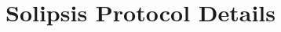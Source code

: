 \section{Solipsis Protocol Details}

\newcommand{\nd}{\ensuremath{\textsc{nd}}\xspace}
\newcommand{\UID}{\ensuremath{\textsc{UID}}\xspace}
\newcommand{\pos}{\ensuremath{\textsc{pos}}\xspace}
\newcommand{\sn}{\ensuremath{\textsc{sn}}\xspace}

\newcommand{\clist}{\ensuremath{\textsc{cList}}\xspace}
\newcommand{\descs}{\ensuremath{\textsc{descs}}\xspace}
\newcommand{\rn}{\ensuremath{\textsc{rNet}}\xspace}
\newcommand{\gn}{\ensuremath{\textsc{getNeighs}}\xspace}
\newcommand{\route}{\ensuremath{\textsc{route}}\xspace}
\newcommand{\cursn}{\ensuremath{\textsc{cursn}}\xspace}
\newcommand{\cupdate}{\ensuremath{\textsc{cUpd}}\xspace}
\newcommand{\aupdate}{\ensuremath{\textsc{aUpd}}\xspace}


\newcommand{\olist}{\ensuremath{\textsc{ownList}}\xspace}

\newcommand{\vn}{\ensuremath{\textsc{ver}}\xspace}

\newcommand{\msgentry}[1]{\vspace{2ex}\noindent{\large #1}\\}
\newcommand{\recby}[1]{\textbf{received by:} #1\\}
\newcommand{\param}[1]{\textbf{parameters:} #1\\}
\newcommand{\desc}[1]{\\}

\newcommand{\dstruct}[1]{\vspace{2ex}\noindent{\large #1}\\}
\newcommand{\mby}[1]{\textbf{maintained by:} #1\\}





\newcommand{\modtab}{\ensuremath{\textsc{3Dmodels}}\xspace}

\newcommand{\snode}{\ensuremath{\textsc{sNode}}\xspace}

\newcommand{\vlist}{\ensuremath{\textsc{vList}}\xspace}


\newcommand{\modreq}{\ensuremath{\textsc{3Dreq}}\xspace}
\newcommand{\modrep}{\ensuremath{\textsc{3Dresp}}\xspace}


